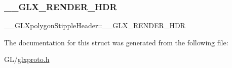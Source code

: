 \subsubsection{\texorpdfstring{\+\_\+\+\_\+\+G\+L\+X\+\_\+\+R\+E\+N\+D\+E\+R\+\_\+\+H\+DR}{\_\_GLX\_RENDER\_HDR}}
{\footnotesize\ttfamily \+\_\+\+\_\+\+G\+L\+Xpolygon\+Stipple\+Header\+::\+\_\+\+\_\+\+G\+L\+X\+\_\+\+R\+E\+N\+D\+E\+R\+\_\+\+H\+DR}



The documentation for this struct was generated from the following file\+:\begin{DoxyCompactItemize}
\item 
G\+L/\hyperlink{glxproto_8h}{glxproto.\+h}\end{DoxyCompactItemize}

